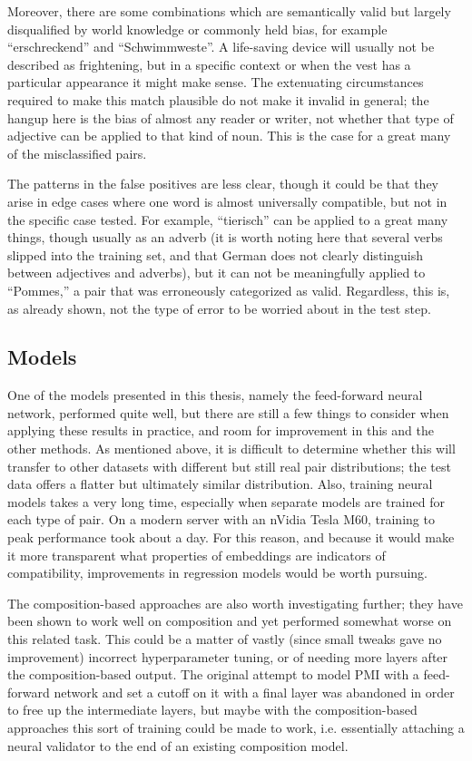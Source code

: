 \documentclass[a4paper, 12pt]{scrartcl}
\begin{document}
Moreover, there are some combinations which are semantically valid but largely disqualified by world knowledge or commonly held bias, for example ``erschreckend'' and ``Schwimmweste''. A life-saving device will usually not be described as frightening, but in a specific context or when the vest has a particular appearance it might make sense. The extenuating circumstances required to make this match plausible do not make it invalid in general; the hangup here is the bias of almost any reader or writer, not whether that type of adjective can be applied to that kind of noun. This is the case for a great many of the misclassified pairs.

The patterns in the false positives are less clear, though it could be that they arise in edge cases where one word is almost universally compatible, but not in the specific case tested. For example, ``tierisch'' can be applied to a great many things, though usually as an adverb (it is worth noting here that several verbs slipped into the training set, and that German does not clearly distinguish between adjectives and adverbs), but it can not be meaningfully applied to ``Pommes,'' a pair that was erroneously categorized as valid. Regardless, this is, as already shown, not the type of error to be worried about in the test step.

\subsection{Models}
One of the models presented in this thesis, namely the feed-forward neural network, performed quite well, but there are still a few things to consider when applying these results in practice, and room for improvement in this and the other methods. As mentioned above, it is difficult to determine whether this will transfer to other datasets with different but still real pair distributions; the test data offers a flatter but ultimately similar distribution. Also, training neural models takes a very long time, especially when separate models are trained for each type of pair. On a modern server with an nVidia Tesla M60, training to peak performance took about a day. For this reason, and because it would make it more transparent what properties of embeddings are indicators of compatibility, improvements in regression models would be worth pursuing.

The composition-based approaches are also worth investigating further; they have been shown to work well on composition and yet performed somewhat worse on this related task. This could be a matter of vastly (since small tweaks gave no improvement) incorrect hyperparameter tuning, or of needing more layers after the composition-based output. The original attempt to model PMI with a feed-forward network and set a cutoff on it with a final layer was abandoned in order to free up the intermediate layers, but maybe with the composition-based approaches this sort of training could be made to work, i.e. essentially attaching a neural validator to the end of an existing composition model.
\end{document}
